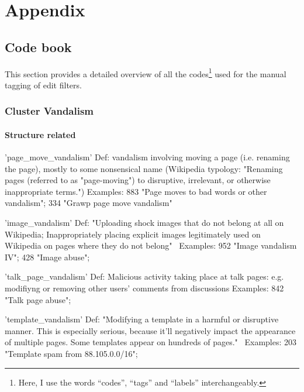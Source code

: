 %

\chapter{Appendix}
\label{ch:Appendix}

\section{Code book}
\label{app:code_book}

This section provides a detailed overview of all the codes\footnote{Here, I use the words ``codes'', ``tags'' and ``labels'' interchangeably.} used for the manual tagging of edit filters.


\subsection{Cluster Vandalism}

\subsubsection{Structure related}

'page\_move\_vandalism'
  Def: vandalism involving moving a page (i.e. renaming the page), mostly to some nonsensical name
  (Wikipedia typology: "Renaming pages (referred to as "page-moving") to disruptive, irrelevant, or otherwise inappropriate terms.")
  Examples: 883 "Page moves to bad words or other vandalism"; 334 "Grawp page move vandalism"

'image\_vandalism'
  Def: "Uploading shock images that do not belong at all on Wikipedia; Inappropriately placing explicit images legitimately used on Wikipedia on pages where they do not belong"~\cite{Wikipedia:VandalismTypes}
  Examples: 952 "Image vandalism IV"; 428 "Image abuse";

'talk\_page\_vandalism'
  Def: Malicious activity taking place at talk pages: e.g. modifiyng or removing other users' comments from discussions
  Examples: 842 "Talk page abuse";

'template\_vandalism'
  Def: "Modifying a template in a harmful or disruptive manner. This is especially serious, because it'll negatively impact the appearance of multiple pages. Some templates appear on hundreds of pages."~\cite{Wikipedia:VandalismTypes}
  Examples: 203 "Template spam from 88.105.0.0/16";

